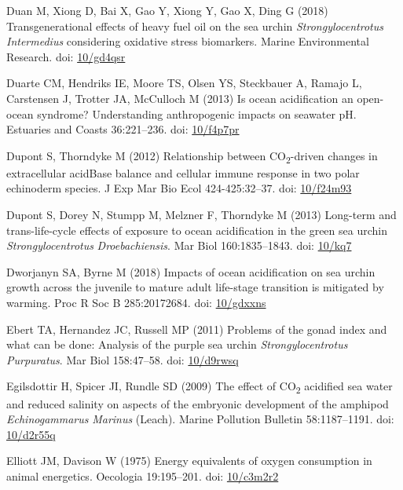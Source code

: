 \documentclass[a4paper,10pt, oneside]{memoir}
\begin{document}
\leavevmode\hypertarget{ref-Duan2018}{}%
Duan M, Xiong D, Bai X, Gao Y, Xiong Y, Gao X, Ding G (2018) Transgenerational effects of heavy fuel oil on the sea urchin \emph{Strongylocentrotus} \emph{Intermedius} considering oxidative stress biomarkers. Marine Environmental Research. doi: \href{https://doi.org/10/gd4qsr}{10/gd4qsr}

\leavevmode\hypertarget{ref-Duarte2013}{}%
Duarte CM, Hendriks IE, Moore TS, Olsen YS, Steckbauer A, Ramajo L, Carstensen J, Trotter JA, McCulloch M (2013) Is ocean acidification an open-ocean syndrome? Understanding anthropogenic impacts on seawater pH. Estuaries and Coasts 36:221--236. doi: \href{https://doi.org/10/f4p7pr}{10/f4p7pr}

\leavevmode\hypertarget{ref-Dupont2012}{}%
Dupont S, Thorndyke M (2012) Relationship between CO\textsubscript{2}-driven changes in extracellular acidBase balance and cellular immune response in two polar echinoderm species. J Exp Mar Bio Ecol 424-425:32--37. doi: \href{https://doi.org/10/f24m93}{10/f24m93}

\leavevmode\hypertarget{ref-Dupont2013}{}%
Dupont S, Dorey N, Stumpp M, Melzner F, Thorndyke M (2013) Long-term and trans-life-cycle effects of exposure to ocean acidification in the green sea urchin \emph{Strongylocentrotus} \emph{Droebachiensis}. Mar Biol 160:1835--1843. doi: \href{https://doi.org/10/kq7}{10/kq7}

\leavevmode\hypertarget{ref-Dworjanyn2018}{}%
Dworjanyn SA, Byrne M (2018) Impacts of ocean acidification on sea urchin growth across the juvenile to mature adult life-stage transition is mitigated by warming. Proc R Soc B 285:20172684. doi: \href{https://doi.org/10/gdxxns}{10/gdxxns}

\leavevmode\hypertarget{ref-Ebert2011}{}%
Ebert TA, Hernandez JC, Russell MP (2011) Problems of the gonad index and what can be done: Analysis of the purple sea urchin \emph{Strongylocentrotus} \emph{Purpuratus}. Mar Biol 158:47--58. doi: \href{https://doi.org/10/d9rwsq}{10/d9rwsq}

\leavevmode\hypertarget{ref-Egilsdottir2009}{}%
Egilsdottir H, Spicer JI, Rundle SD (2009) The effect of CO\textsubscript{2} acidified sea water and reduced salinity on aspects of the embryonic development of the amphipod \emph{Echinogammarus} \emph{Marinus} (Leach). Marine Pollution Bulletin 58:1187--1191. doi: \href{https://doi.org/10/d2r55q}{10/d2r55q}

\leavevmode\hypertarget{ref-Elliott1975}{}%
Elliott JM, Davison W (1975) Energy equivalents of oxygen consumption in animal energetics. Oecologia 19:195--201. doi: \href{https://doi.org/10/c3m2r2}{10/c3m2r2}
\end{document}
